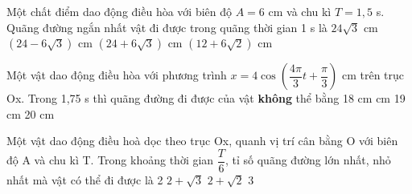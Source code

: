 \begin{vidu}%
Một chất điểm dao động điều hòa với biên độ $A = 6$ cm và chu kì $T = 1,5$ s. Quãng đường ngắn nhất vật đi được trong quãng thời gian 1 s là
\choice
{$24\sqrt{3}$ cm}
{\True $(24 - 6\sqrt{3})$ cm}
{$(24 + 6\sqrt{3})$ cm}
{$(12 + 6\sqrt{2})$ cm}
\end{vidu} %
\begin{vidu}%
Một vật dao động điều hòa với phương trình $x=4\cos \left( \dfrac{4\pi}{3}t+\dfrac{\pi}{3} \right)$ cm trên trục Ox. Trong 1,75 s thì quãng đường đi được của vật \textbf{không} thể bằng
\choice
{18 cm}
{ cm}
{19 cm}
{20 cm}

\end{vidu} %
\begin{vidu}%
Một vật dao động điều hoà dọc theo trục Ox, quanh vị trí cân bằng O với biên độ A và chu kì T. Trong khoảng thời gian $\dfrac{T}{6}$, tỉ số quãng đường lớn nhất, nhỏ nhất mà vật có thể đi được là
\choice
{2}
{\True $2+\sqrt{3}$}
{$2+\sqrt{2}$}
{3}
\end{vidu} %

